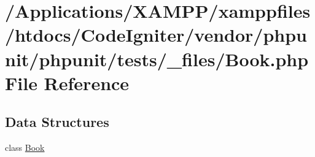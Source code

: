 \hypertarget{phpunit_2phpunit_2tests_2__files_2_book_8php}{}\section{/\+Applications/\+X\+A\+M\+P\+P/xamppfiles/htdocs/\+Code\+Igniter/vendor/phpunit/phpunit/tests/\+\_\+files/\+Book.php File Reference}
\label{phpunit_2phpunit_2tests_2__files_2_book_8php}
\subsection*{Data Structures}
\begin{DoxyCompactItemize}
\item 
class \mbox{\hyperlink{class_book}{Book}}
\end{DoxyCompactItemize}
